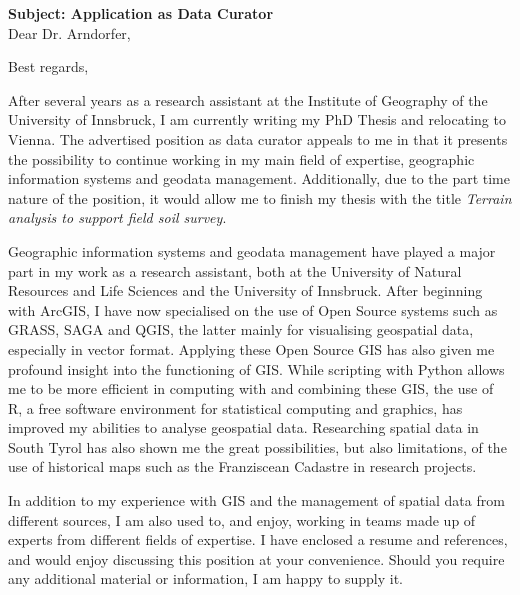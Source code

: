 \documentclass[11pt,a4paper,sans]{moderncv}        %
\begin{document}

\date{February 12, 2018}
\opening{\textbf{Subject: Application as Data Curator} \\[0.5cm]     Dear Dr. Arndorfer,}
\closing{Best regards,}
\makelettertitle
\justify
After several years as a research assistant at the Institute of Geography of the University of Innsbruck, I am currently writing my PhD Thesis and relocating to Vienna. The advertised position as data curator  appeals to me in that it presents the possibility to continue working in my main field of expertise, geographic information systems and geodata management. Additionally, due to the part time nature of the position, it would allow me to finish my thesis with the title \emph{Terrain analysis to support field soil survey}.

Geographic information systems and geodata management have played a major part in my work as a research assistant, both at the University of Natural Resources and Life Sciences and the University of Innsbruck. After beginning with ArcGIS, I have now specialised on the use of Open Source systems such as GRASS, SAGA and QGIS, the latter mainly for visualising geospatial data, especially in vector format. Applying these Open Source GIS has also given me profound insight into the functioning of GIS. While scripting with Python allows me to be more efficient in computing with and combining these GIS, the use of R, a free software environment for statistical computing and graphics, has improved my  abilities to analyse geospatial data. Researching spatial data in South Tyrol has also shown me the great possibilities, but also limitations, of the use of historical maps such as the Franziscean Cadastre in research projects.  

In addition to my experience with GIS and the management of spatial data from different sources, I am also used to, and enjoy, working in teams made up of experts from different fields of expertise. I have enclosed a resume and references, and would enjoy discussing this position at your
convenience. Should you require any additional material or information, I am happy to supply it.
\end{document}
